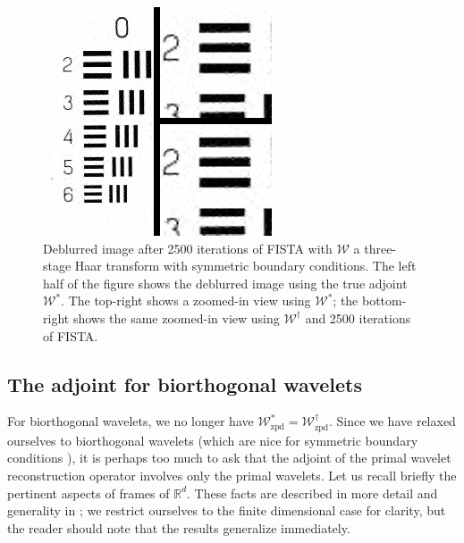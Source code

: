 \documentclass[journal]{IEEEtran}
\newcommand{\reals}{\mathbb{R}}
\begin{document}
\begin{figure}
   \centering
   \includegraphics[width=0.8\columnwidth]{figures/compare_db1_sym_2500.png}
   \caption{Deblurred image after 2500 iterations of FISTA with $\mathcal{W}$ a three-stage Haar transform with symmetric boundary conditions.  The left half of the figure shows the deblurred image using the true adjoint $\mathcal{W}^\ast$.  The top-right shows a zoomed-in view using $\mathcal{W}^\ast$; the bottom-right shows the same zoomed-in view using $\mathcal{W}^\dagger$ and 2500 iterations of FISTA.}
   \label{fig:compare_db1_sym}
\end{figure}


\subsection{The adjoint for biorthogonal wavelets}
For biorthogonal wavelets, we no longer have $\mathcal{W}_\text{zpd}^\ast=\mathcal{W}_\text{zpd}^\dagger$.  Since we have relaxed ourselves to biorthogonal wavelets (which are nice for symmetric boundary conditions \cite{rout_2003}), it is perhaps too much to ask that the adjoint of the primal wavelet reconstruction operator involves only the primal wavelets.  Let us recall briefly the pertinent aspects of frames of $\reals^d$.  These facts are described in more detail and generality in \cite{mallat_2009}; we restrict ourselves to the finite dimensional case for clarity, but the reader should note that the results generalize immediately.\\
\end{document}
